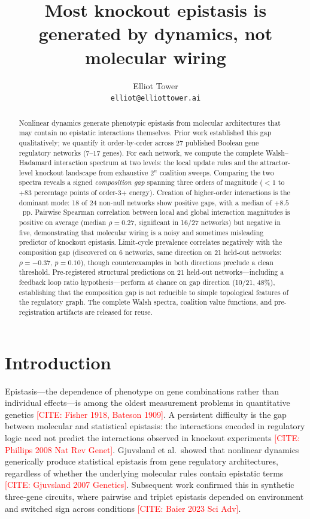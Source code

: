 \documentclass[11pt]{article}
\title{Most knockout epistasis is generated by dynamics, not molecular wiring}
\author{
  Elliot Tower \\
  \texttt{elliot@elliottower.ai}
}
\newcommand{\citeneeded}[1]{\textcolor{red}{[CITE: #1]}}
\begin{document}
\maketitle

\begin{abstract}
Nonlinear dynamics generate phenotypic epistasis from molecular
architectures that may contain no epistatic interactions themselves.
Prior work established this gap qualitatively; we quantify it
order-by-order across 27 published Boolean gene regulatory networks
(7--17 genes). For each network, we compute the complete
Walsh--Hadamard interaction spectrum at two levels: the local update
rules and the attractor-level knockout landscape from exhaustive
$2^n$ coalition sweeps. Comparing the two spectra reveals a signed
\emph{composition gap} spanning three orders of magnitude ($< 1$ to
$+83$ percentage points of order-3+ energy). Creation of higher-order
interactions is the dominant mode: 18 of 24 non-null networks show
positive gaps, with a median of $+8.5$~pp. Pairwise Spearman
correlation between local and global interaction magnitudes is positive
on average (median $\rho = 0.27$, significant in 16/27 networks) but
negative in five, demonstrating that molecular wiring is a noisy and
sometimes misleading predictor of knockout epistasis. Limit-cycle prevalence correlates negatively with the composition gap
(discovered on 6 networks, same direction on 21 held-out networks:
$\rho = -0.37$, $p = 0.10$), though counterexamples in both
directions preclude a clean threshold. Pre-registered structural
predictions on 21 held-out networks---including a feedback loop ratio
hypothesis---perform at chance on gap direction (10/21, 48\%),
establishing that the composition gap is not reducible to simple
topological features of the regulatory graph. The complete Walsh spectra, coalition value functions, and
pre-registration artifacts are released for reuse.
\end{abstract}


\section{Introduction}
\label{sec:intro}

Epistasis---the dependence of phenotype on gene combinations rather
than individual effects---is among the oldest measurement problems in
quantitative genetics \citeneeded{Fisher 1918, Bateson 1909}. A
persistent difficulty is the gap between molecular and statistical
epistasis: the interactions encoded in regulatory logic need not
predict the interactions observed in knockout experiments
\citeneeded{Phillips 2008 Nat Rev Genet}. Gjuvsland et al.\ showed
that nonlinear dynamics generically produce statistical epistasis from
gene regulatory architectures, regardless of whether the underlying
molecular rules contain epistatic terms \citeneeded{Gjuvsland 2007
Genetics}. Subsequent work confirmed this in synthetic three-gene
circuits, where pairwise and triplet epistasis depended on environment
and switched sign across conditions \citeneeded{Baier 2023 Sci Adv}.
\end{document}
